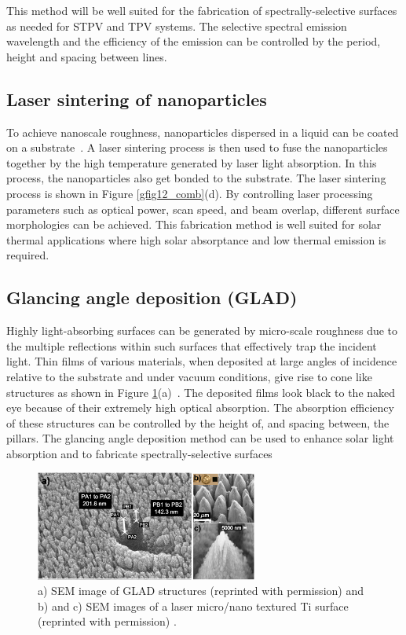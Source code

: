 \documentclass[10pt,letterpaper]{article}
\begin{document}
This method will be well suited for the fabrication of spectrally-selective surfaces as 
needed for STPV and TPV systems.  The selective spectral emission wavelength and the 
efficiency of the emission can be controlled by the period, height and spacing between lines.

\subsection{Laser sintering of nanoparticles}
To achieve nanoscale roughness, nanoparticles dispersed in a liquid can be coated on a substrate~\cite{LaserProcessing}. A laser sintering process is then used to fuse the nanoparticles together by the high temperature generated by laser light absorption. In this process, the nanoparticles also get bonded to the substrate. The laser sintering process is shown in Figure \ref{gfig12_comb}(d).  By controlling laser processing parameters such as optical power, scan speed, and beam overlap, different surface morphologies can be achieved. This fabrication method is well suited for solar thermal applications where high solar absorptance and low thermal emission is required.

\subsection{Glancing angle deposition (GLAD)}
Highly light-absorbing surfaces can be generated by micro-scale roughness 
due to the multiple reflections within such surfaces that effectively trap the incident light.  
Thin films of various materials, when deposited at large angles of incidence
relative to the substrate and under vacuum conditions, give rise to cone like 
structures as shown in Figure \ref{gfig45_comb}(a)~\cite{GlancingAngle}. The deposited films look black to the 
naked eye because of their extremely high optical absorption.  The absorption efficiency of 
these structures can be controlled by the height of, and spacing between, the pillars.  
The glancing angle deposition method can be used to enhance solar light absorption 
and to fabricate spectrally-selective surfaces

\begin{figure}[ht]
	\includegraphics[width=0.65\textwidth]{gfig45_comb}
	\caption{\label{gfig45_comb} a) SEM image of GLAD structures (reprinted with permission) \cite{gfig4ref} and b) and c) SEM images of a laser micro/nano textured Ti surface (reprinted with permission) \cite{g28}.} %
\end{figure} 
\end{document}
